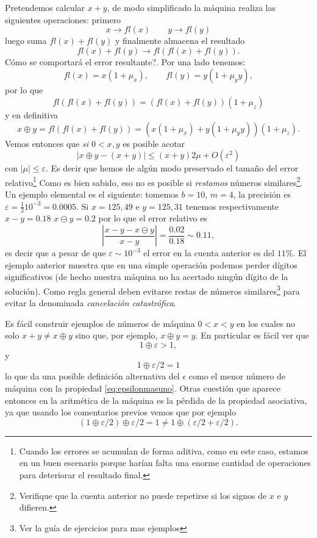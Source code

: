 Pretendemos calcular $x+y$, de modo simplificado la máquina realiza las siguientes operaciones: primero
$$
x\to fl(x) \qquad y\to fl(y)
$$
luego suma $fl(x)+fl(y)$ y finalmente almacena el resultado
$$
fl(x)+fl(y)\to fl(fl(x)+fl(y)).
$$
Cómo se comportará el error resultante?.
Por una lado tenemos:
$$fl(x)=x(1+\mu_x),\qquad  fl(y)=y(1+\mu_y
y),$$ por lo que
$$fl(fl(x)+fl(y))=(fl(x)+fl(y))(1+\mu_z)$$
y en definitiva
$$
x\oplus y =fl(fl(x)+fl(y))=(x(1+\mu_x)+y(1+\mu_y
y))(1+\mu_z).
$$
Vemos entonces que \emph{si $0<x,y$} es posible acotar
$$
|x\oplus y -(x+y)|\le (x+y)2\mu +O(\varepsilon^2)
$$
con $|\mu|\le \varepsilon$. Es decir que hemos de algún modo preservado el tamaño del error relativo\footnote{Cuando los errores se acumulan de forma aditiva, como en este caso, estamos en un buen escenario porque harían falta una enorme cantidad de operaciones para deteriorar el resultado final.}  Como es  bien sabido, eso no es posible si \emph{restamos}
números similares\footnote{Verifique que la cuenta anterior no puede repetirse si los signos de $x$ e $y$ difieren.}.
Un ejemplo elemental es el siguiente: tomemos $b=10$, $m=4$, la precisión es $\varepsilon=\frac{1}{2}10^{-3}=0.0005$. Si $x=125,49$ e $y=125,31$ tenemos respectivamente
$x-y=0.18$
$x\ominus y=0.2$ por lo que el error relativo es
$$
|\frac{x-y-x\ominus y}{x-y}|=\frac{0.02}{0.18}\sim 0.11,
$$
es decir que a pesar de que $\varepsilon \sim 10^{-3}$ el error en la cuenta anterior es del $11\%$. El ejemplo anterior muestra que en una simple operación podemos perder dígitos significativos (de hecho nuestra máquina no ha acertado ningún dígito de la solución). Como regla general deben evitarse restas de números similares\footnote{Ver la guía de ejercicios para mas ejemplos} para evitar la denominada \emph{cancelación catastrófica}.

Es fácil construir ejemplos de números de máquina $0<x<y$ en los cuales no solo $x+y\neq x\oplus y$ sino que, por ejemplo, $x\oplus y=y$. En particular es fácil ver que
\begin{equation}
 \label{eq:epsilonmasuno}
 1 \oplus\varepsilon> 1,
\end{equation}
y
$$
1\oplus\varepsilon/2=1
$$
lo que da una posible definición alternativa del $\epsilon$ como el menor número de máquina con la  propiedad \eqref{eq:epsilonmasuno}.
Otras cuestión que aparece entonces en la aritmética de la máquina es la pérdida de la propiedad asociativa, ya que usando los comentarios previos vemos que por ejemplo
$$
(1\oplus \varepsilon/2)\oplus \varepsilon/2=1\neq 1\oplus (\varepsilon/2+\varepsilon/2).
$$

